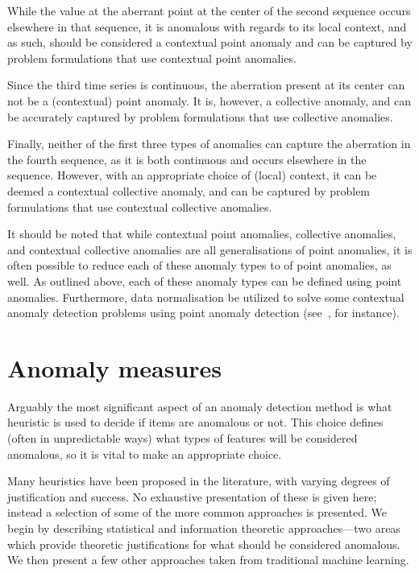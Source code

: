 While the value at the aberrant point at the center of the second sequence occurs elsewhere in that sequence, it is anomalous with regards to its local context, and as such, should be considered a contextual point anomaly and can be captured by problem formulations that use contextual point anomalies.

Since the third time series is continuous, the aberration present at its center can not be a (contextual) point anomaly. It is, however, a collective anomaly, and can be accurately captured by problem formulations that use collective anomalies.

Finally, neither of the first three types of anomalies can capture the aberration in the fourth sequence, as it is both continuous and occurs elsewhere in the sequence. However, with an appropriate choice of (local) context, it can be deemed a contextual collective anomaly, and can be captured by problem formulations that use contextual collective anomalies.

It should be noted that while contextual point anomalies, collective anomalies, and contextual collective anomalies are all generalisations of point anomalies, it is often possible to reduce each of these anomaly types to of point anomalies, as well. As outlined above, each of these anomaly types can be defined using point anomalies. Furthermore, data normalisation be utilized to solve some contextual anomaly detection problems using point anomaly detection (see~\cite{meckesheimer}, for instance).

\section{Anomaly measures}
\label{sect:anomaly_measures}

Arguably the most significant aspect of an anomaly detection method is what heuristic is used to decide if items are anomalous or not. This choice defines (often in unpredictable ways) what types of features will be considered anomalous, so it is vital to make an appropriate choice.

Many heuristics have been proposed in the literature, with varying degrees of justification and success. No exhaustive presentation of these is given here; instead a selection of some of the more common approaches is presented. We begin by describing statistical and information theoretic approaches---two areas which provide theoretic justifications for what should be considered anomalous. We then present a few other approaches taken from traditional machine learning.

